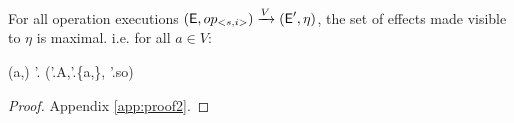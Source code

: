 %
%
\begin{theorem}
\label{theorem:two}
For all operation executions 
{\scriptsize $
({\normalfont \textsf{E}},op_{<s,i>}) 
    \xrightarrow{V}
  ({\normalfont \textsf{E}}',\eta) 
$},
the set of effects made visible to $\eta$ is maximal. i.e. for all
 $a \in V$:
\begin{fmathpar}
(a,\eta) \not\in \E'.\visZ \Rightarrow 
(\E'.A,\E'.\visZ \cup \{a,\eta\}, \E'.so) \not\models \psi[\eta/\hat{\eta}]
\end{fmathpar}
\end{theorem}


\begin{proof}
Appendix \ref{app:proof2}. 
\end{proof}




